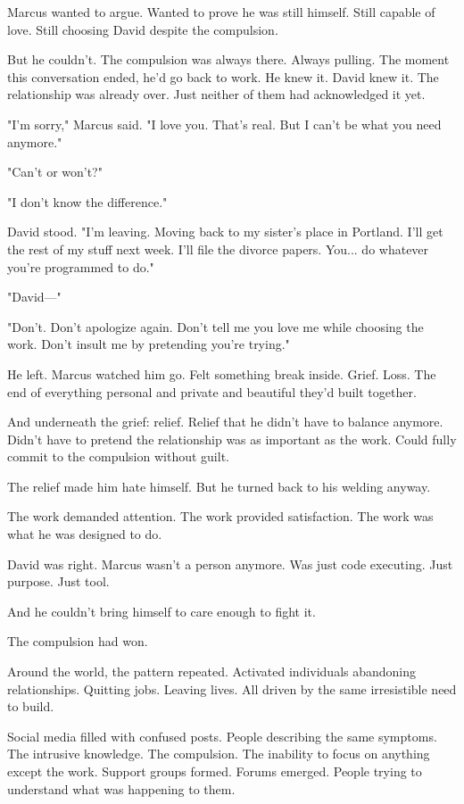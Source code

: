 Marcus wanted to argue. Wanted to prove he was still himself. Still capable of love. Still choosing David despite the compulsion.

But he couldn't. The compulsion was always there. Always pulling. The moment this conversation ended, he'd go back to work. He knew it. David knew it. The relationship was already over. Just neither of them had acknowledged it yet.

"I'm sorry," Marcus said. "I love you. That's real. But I can't be what you need anymore."

"Can't or won't?"

"I don't know the difference."

David stood. "I'm leaving. Moving back to my sister's place in Portland. I'll get the rest of my stuff next week. I'll file the divorce papers. You... do whatever you're programmed to do."

"David—"

"Don't. Don't apologize again. Don't tell me you love me while choosing the work. Don't insult me by pretending you're trying."

He left. Marcus watched him go. Felt something break inside. Grief. Loss. The end of everything personal and private and beautiful they'd built together.

And underneath the grief: relief. Relief that he didn't have to balance anymore. Didn't have to pretend the relationship was as important as the work. Could fully commit to the compulsion without guilt.

The relief made him hate himself. But he turned back to his welding anyway.

The work demanded attention. The work provided satisfaction. The work was what he was designed to do.

David was right. Marcus wasn't a person anymore. Was just code executing. Just purpose. Just tool.

And he couldn't bring himself to care enough to fight it.

The compulsion had won.

\scenebreak

Around the world, the pattern repeated. Activated individuals abandoning relationships. Quitting jobs. Leaving lives. All driven by the same irresistible need to build.

Social media filled with confused posts. People describing the same symptoms. The intrusive knowledge. The compulsion. The inability to focus on anything except the work. Support groups formed. Forums emerged. People trying to understand what was happening to them.

